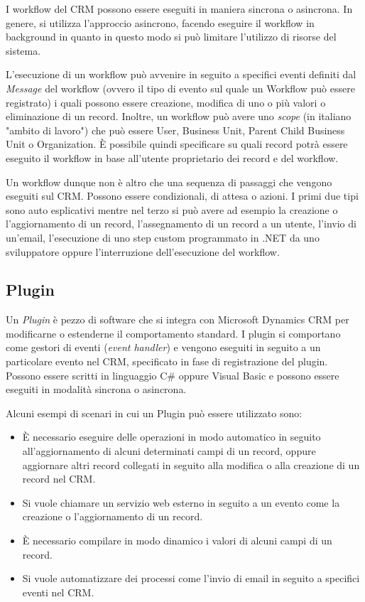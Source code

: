 I workflow del CRM possono essere eseguiti in maniera sincrona o asincrona. In genere, si utilizza l'approccio asincrono, facendo eseguire il workflow in background in quanto in questo modo si può limitare l'utilizzo di risorse del sistema.

L'esecuzione di un workflow può avvenire in seguito a specifici eventi definiti dal \textit{Message} del workflow (ovvero il tipo di evento sul quale un Workflow può essere registrato) i quali possono essere creazione, modifica di uno o più valori o eliminazione di un record. Inoltre, un workflow può avere uno \textit{scope} (in italiano "ambito di lavoro") che può essere User, Business Unit, Parent Child Business Unit o Organization. È possibile quindi specificare su quali record potrà essere eseguito il workflow in base all'utente proprietario dei record e del workflow.

Un workflow dunque non è altro che una sequenza di passaggi che vengono eseguiti sul CRM. Possono essere condizionali, di attesa o azioni. I primi due tipi sono auto esplicativi mentre nel terzo si può avere ad esempio la creazione o l'aggiornamento di un record, l'assegnamento di un record a un utente, l'invio di un'email, l'esecuzione di uno step custom programmato in .NET da uno sviluppatore oppure l'interruzione dell'esecuzione del workflow.

\subsection{Plugin}
Un \textit{Plugin} è pezzo di software che si integra con Microsoft Dynamics CRM per modificarne o estenderne il comportamento standard. I plugin si comportano come gestori di eventi (\textit{event handler}) e vengono eseguiti in seguito a un particolare evento nel CRM, specificato in fase di registrazione del plugin. Possono essere scritti in linguaggio C\# oppure Visual Basic e possono essere eseguiti in modalità sincrona o asincrona.

Alcuni esempi di scenari in cui un Plugin può essere utilizzato sono:
\begin{itemize}
  \item È necessario eseguire delle operazioni in modo automatico in seguito all'aggiornamento di alcuni determinati campi di un record, oppure aggiornare altri record collegati in seguito alla modifica o alla creazione di un record nel CRM.
  \item Si vuole chiamare un servizio web esterno in seguito a un evento come la creazione o l'aggiornamento di un record.
  \item È necessario compilare in modo dinamico i valori di alcuni campi di un record.
  \item Si vuole automatizzare dei processi come l'invio di email in seguito a specifici eventi nel CRM.
\end{itemize}

